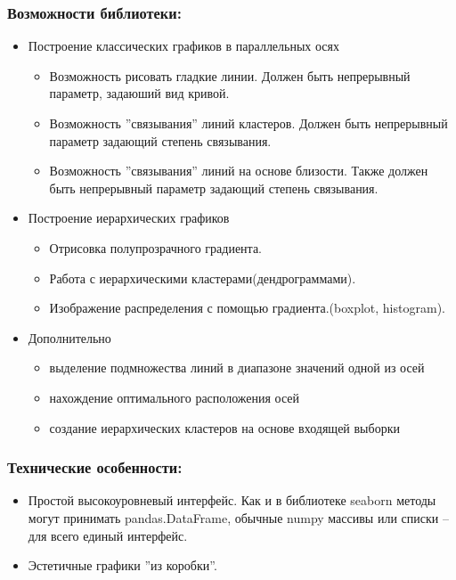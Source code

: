 \documentclass[12pt,fleqn]{article}
\begin{document}
\subsubsection{Возможности библиотеки:}
\begin{itemize}
    \item Построение классических графиков в параллельных осях
    \begin{itemize}
        \item Возможность рисовать гладкие линии. Должен быть непрерывный параметр,
        задаюший вид кривой.
        \item Возможность ''связывания'' линий кластеров.
        Должен быть непрерывный параметр задающий степень связывания.
        \item Возможность ''связывания'' линий на основе близости. Также 
        должен быть непрерывный параметр задающий степень связывания. 
    \end{itemize}
    \item Построение иерархических графиков
    \begin{itemize}
        \item Отрисовка полупрозрачного градиента.
        \item Работа с иерархическими кластерами(дендрограммами).
        \item Изображение распределения с помощью градиента.(boxplot, histogram).
    \end{itemize}
    \item Дополнительно
    \begin{itemize}
        \item выделение подмножества линий в  диапазоне значений одной из осей
        \item нахождение оптимального расположения осей
        \item создание иерархических кластеров на основе входящей выборки
    \end{itemize}
\end{itemize}

\subsubsection{Технические особенности:}
\begin{itemize}
    \item Простой высокоуровневый интерфейс. Как и в библиотеке seaborn методы могут принимать pandas.DataFrame,
    обычные numpy массивы или списки -- для всего единый интерфейс.
    \item Эстетичные графики ''из коробки''.
\end{itemize}
\end{document}
